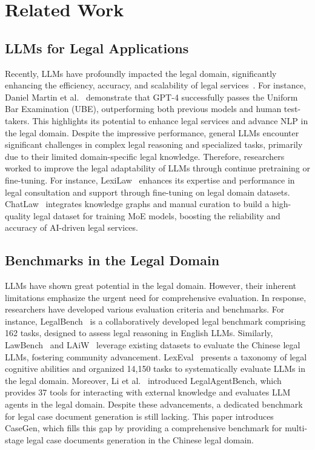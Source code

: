 \section{Related Work}
\subsection{LLMs for Legal Applications}
Recently, LLMs have profoundly impacted the legal domain, significantly enhancing the efficiency, accuracy, and scalability of legal services~\cite{lai2024large,li2024bladeenhancingblackboxlarge}. 
For instance, Daniel Martin et al.~\cite{katz2024gpt} demonstrate that GPT-4 successfully passes the Uniform Bar Examination (UBE), outperforming both previous models and human test-takers. This highlights its potential to enhance legal services and advance NLP in the legal domain.
Despite the impressive performance, general LLMs encounter significant challenges in complex legal reasoning and specialized tasks, primarily due to their limited domain-specific legal knowledge. 
Therefore, researchers worked to improve the legal adaptability of LLMs  through continue pretraining or fine-tuning. For instance, LexiLaw~\cite{LexiLaw} enhances its expertise and performance in legal consultation and support through fine-tuning on legal domain datasets. ChatLaw~\cite{cui2023chatlaw} integrates knowledge graphs and manual curation to build a high-quality legal dataset for training MoE models, boosting the reliability and accuracy of AI-driven legal services.


\subsection{Benchmarks in the Legal Domain}
LLMs have shown great potential in the legal domain. However, their inherent limitations emphasize the urgent need for comprehensive evaluation. In response, researchers have developed various evaluation criteria and benchmarks.
For instance, LegalBench~\cite{guha2024legalbench} is a collaboratively developed legal benchmark comprising 162 tasks, designed to assess legal reasoning in English LLMs.  Similarly, LawBench~\cite{fei2023lawbench} and LAiW~\cite{dai2023laiw} leverage existing datasets to evaluate the Chinese legal LLMs, fostering community advancement.
LexEval~\cite{lilexeval} presents a taxonomy of legal cognitive abilities and organized 14,150 tasks to systematically evaluate LLMs in the legal domain.
Moreover, Li et al.~\cite{li2024legalagentbench} introduced LegalAgentBench, which provides 37 tools for interacting with external knowledge and evaluates LLM agents in the legal domain. 
Despite these advancements, a dedicated benchmark for legal case document generation is still lacking.
This paper introduces CaseGen, which fills this gap by providing a comprehensive benchmark for multi-stage legal case documents generation in the Chinese legal domain.
